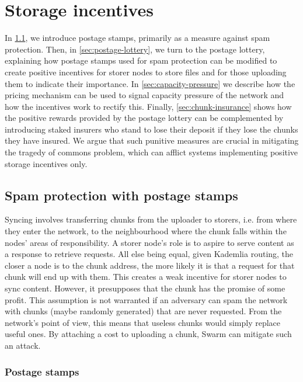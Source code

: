 \section{Storage incentives \statusyellow}\label{sec:storage-incentives}


In \ref{sec:postage-stamps}, we introduce postage stamps, primarily as a measure against spam protection.  
Then, in \ref{sec:postage-lottery}, we turn to the postage lottery, explaining how postage stamps used for spam protection can be modified to create positive incentives for storer nodes to store files and for those uploading them to indicate their importance. In \ref{sec:capacity-pressure} we describe how the pricing mechanism can be used to signal capacity pressure of the network and how the incentives work to rectify this. Finally, \ref{sec:chunk-insurance} shows how the  positive rewards provided by the postage lottery can be complemented by introducing staked insurers who stand to lose their deposit if they lose  the chunks they have insured. We argue that such punitive measures are crucial in mitigating the tragedy of commons problem, which can afflict systems implementing positive storage incentives only. 

\subsection{Spam protection with postage stamps\statusgreen}\label{sec:postage-stamps}
\green{}

Syncing involves transferring chunks from the uploader to storers, i.e. from where they enter the network, to the neighbourhood where the chunk falls within the nodes' areas of responsibility. A storer node's role is to aspire to serve content as a response to retrieve requests. All else being equal, given Kademlia routing, the closer a node is to the chunk address, the more likely it is that a request for that chunk will end up with them. This creates a weak incentive for storer nodes to sync content. However, it presupposes that the chunk has the promise of some profit. This assumption is not warranted if an adversary can spam the network with chunks (maybe randomly generated) that are never requested. From the network's point of view, this means that useless chunks would simply replace useful ones. By attaching a cost to uploading a chunk, Swarm can mitigate such an attack.


\subsubsection{Postage stamps}

